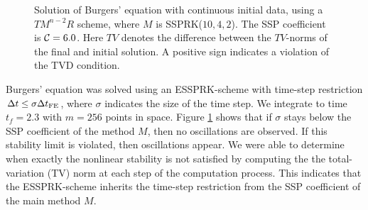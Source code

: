 \begin{figure}[t!]
    \centering
    \caption{Solution of Burgers' equation with continuous initial data, using a 
    $TM^{n-2}R$ scheme, where $ M $ is SSPRK($10,4,2$). 
    The SSP coefficient is $\mathcal{C} = 6.0$. 
    Here $TV$ denotes the difference between the $TV$-norms of the final and 
    initial solution.
    A positive sign indicates a violation of the TVD condition.}
    \label{fig:burgers_cont}
\end{figure}

Burgers' equation was solved using an ESSPRK-scheme with time-step 
restriction $\Delta t \leq \sigma{\Delta t}_{\text{FE}}$, where $\sigma$ indicates the size 
of the time step. 
We integrate to time $t_{f} = 2.3$
with $m = 256$ points in space.
Figure \ref{fig:burgers_cont} shows that if $\sigma$ stays below the SSP 
coefficient of the method $M$, then no oscillations are observed. 
If this stability limit is violated, then oscillations appear. 
We were able to determine when exactly the nonlinear stability is not 
satisfied by computing the the total-variation (TV) norm at each step of the 
computation process. 
This indicates that the ESSPRK-scheme inherits the time-step restriction 
from the SSP coefficient of the main method $M$.


